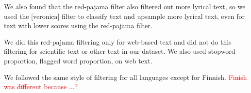 We also found that the red-pajama filter also filtered out more lyrical text, so we used the [veronica] filter to classify text and upsample more lyrical text, even for text with lower scores using the red-pajama filter.

We did this red-pajama filtering only for web-based text and did not do this filtering for scientific text or other text in our dataset.
We also used stopword proportion, flagged word proportion, on web text.

We followed the same style of filtering for all languages except for Finnish.
\textcolor{red}{Finish was different because ...?}



 
% 

\fi